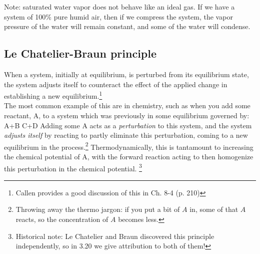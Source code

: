 \documentclass[12pt]{article}
\begin{document}
Note: saturated water vapor does not behave like an ideal gas. If we have a system of 100\% pure humid air, then if we compress the system, the vapor pressure of the water will remain constant, and some of the water will condense. %


\subsection{Le Chatelier-Braun principle}
 When a system, initially at equilibrium, is perturbed from its equilibrium state, the system adjusts itself to counteract the effect of the applied change in establishing a new equilibrium.\footnote{Callen provides a good discussion of this in Ch. 8-4 (p. 210)}\\
The most common example of this are in chemistry, such as when you add some reactant, A, to a system which was previously in some equilibrium governed by:
\eqs A+B \longleftrightarrow C+D\eqe
Adding some A acts as a\emph{ perturbation} to this system, and the system \emph{ adjusts itself} by reacting to partly eliminate this perturbation,
coming to a new equilibrium in the process.\footnote{Throwing away the thermo jargon: if you put a bit of $A$ in, some of that $A$ reacts, so the concentration of $A$ becomes less.} Thermodynamically, this is tantamount to increasing the chemical potential of A, with the forward reaction
acting to then homogenize this perturbation in the chemical potential. \footnote{Historical note: Le Chatelier and Braun discovered this principle independently,
so in 3.20 we give attribution to both of them!}
\end{document}

